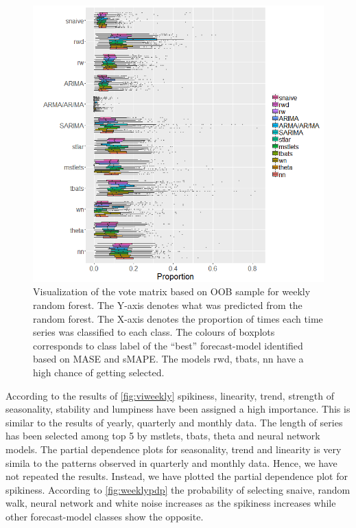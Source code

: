 \documentclass[11pt,a4paper,]{article}
\begin{document}
\begin{figure}
\centering
\includegraphics{figures/oobweekly-1.png}
\caption{\label{fig:oobweekly}Visualization of the vote matrix based on OOB
sample for weekly random forest. The Y-axis denotes what was predicted
from the random forest. The X-axis denotes the proportion of times each
time series was classified to each class. The colours of boxplots
corresponds to class label of the ``best'' forecast-model identified
based on MASE and sMAPE. The models rwd, tbats, nn have a high chance of
getting selected.}
\end{figure}

According to the results of \autoref{fig:viweekly} spikiness, linearity,
trend, strength of seasonality, stability and lumpiness have been
assigned a high importance. This is similar to the results of yearly,
quarterly and monthly data. The length of series has been selected among
top 5 by mstlets, tbats, theta and neural network models. The partial
dependence plots for seasonality, trend and linearity is very simila to
the patterns observed in quarterly and monthly data. Hence, we have not
repeated the results. Instead, we have plotted the partial dependence
plot for spikiness. According to \autoref{fig:weeklypdp} the probability
of selecting snaive, random walk, neural network and white noise
increases as the spikiness increases while other forecast-model classes
show the opposite.
\end{document}
